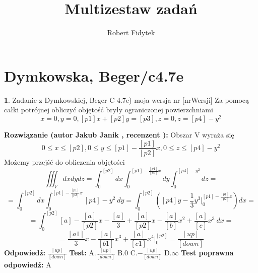 \documentclass[12pt, a4paper]{article}
\title{Multizestaw zadań}
\author{Robert Fidytek}
\date{}
\theoremstyle{definition} %
\newtheorem{zad}{}
\newcommand{\kategoria}[1]{\section{#1}} %
\newcommand{\zadStart}[1]{\begin{zad}#1\newline} %
\newcommand{\zadStop}{\end{zad}}   %
\newcommand{\rozwStart}[2]{\noindent \textbf{Rozwiązanie (autor #1 , recenzent #2): }\newline} %
\newcommand{\rozwStop}{\newline}                                            %
\newcommand{\odpStart}{\noindent \textbf{Odpowiedź:}\newline}    %
\newcommand{\odpStop}{\newline}                                             %
\newcommand{\testStart}{\noindent \textbf{Test:}\newline} %
\newcommand{\testStop}{\newline} %
\newcommand{\kluczStart}{\noindent \textbf{Test poprawna odpowiedź:}\newline} %
\newcommand{\kluczStop}{\newline} %
\begin{document}
\maketitle


\kategoria{Dymkowska, Beger/c4.7e}
\zadStart{Zadanie z Dymkowskiej, Beger C 4.7e) moja wersja nr [nrWersji]}
Za pomocą całki potrójnej obliczyć objętość bryły ograniczonej powierzchniami
$$x=0, y=0, [p1]x+[p2]y=[p3], z=0, z=[p4]-y^2$$
\zadStop
\rozwStart{Jakub Janik}{}
Obszar V wyraża się $$0 \leq x \leq [p2], 0 \leq y \leq [p1]-\frac{[p1]}{[p2]}x, 0 \leq z \leq [p4]-y^2$$
Możemy przejść do obliczenia objętości
$$\iiint_V dxdydz=\int_0^{[p2]}dx\int_0^{[p1]-\frac{[p1]}{[p2]}x}dy\int_0^{[p4]-y^2}dz=$$
$$=\int_0^{[p2]}dx\int_0^{[p1]-\frac{[p1]}{[p2]}x}[p4]-y^2\ dy=\int_0^{[p2]}([p4]y-\frac{1}{3}y^3\Big|_0^{[p1]-\frac{[p1]}{[p2]}x})dx=$$
$$=\int_0^{[p2]}[a]-\frac{[a]}{[p2]}x-\frac{[a]}{3}+\frac{[a]}{[p2]}x-\frac{[a]}{[b]}x^2+\frac{[a]}{[c]}x^3\ dx=$$
$$=\frac{[a1]}{3}x-\frac{[a]}{[b1]}x^3+\frac{[a]}{[c1]}x^4\Big|_0^{[p2]}=\frac{[up]}{[down]}$$
\rozwStop
\odpStart
$\frac{[up]}{[down]}$
\odpStop
\testStart
A.$\frac{[up]}{[down]}$
B.$0$
C.$-\frac{[up]}{[down]}$
D.$\infty$
\testStop
\kluczStart
A
\kluczStop
\end{document}
